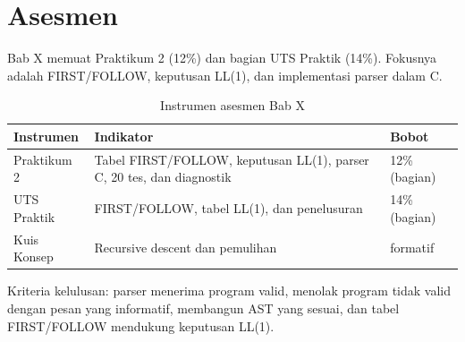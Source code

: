 \section*{Asesmen}

Bab X memuat Praktikum 2 (12\%) dan bagian UTS Praktik (14\%).
Fokusnya adalah FIRST/FOLLOW, keputusan LL(1), dan implementasi
parser dalam C.

\begin{table}[H]
\centering
\caption{Instrumen asesmen Bab X}
\label{tab:ch10-asesmen}
\begin{tabularx}{\textwidth}{@{}lXl@{}}
\toprule
\textbf{Instrumen} & \textbf{Indikator} & \textbf{Bobot} \\
\midrule
Praktikum 2 & Tabel FIRST/FOLLOW, keputusan LL(1), parser C, 20 tes,
dan diagnostik & 12\% (bagian) \\
UTS Praktik & FIRST/FOLLOW, tabel LL(1), dan penelusuran &
14\% (bagian) \\
Kuis Konsep & Recursive descent dan pemulihan & formatif \\
\bottomrule
\end{tabularx}
\end{table}

Kriteria kelulusan: parser menerima program valid, menolak program
tidak valid dengan pesan yang informatif, membangun AST yang sesuai,
dan tabel FIRST/FOLLOW mendukung keputusan LL(1).

